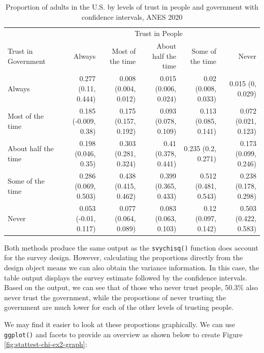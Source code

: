\documentclass[
]{krantz}
\begin{document}
\begin{longtable}{l|rrrrr}
\caption{\label{tab:stattest-chi-ex2-prop2-tab}Proportion of adults in the U.S. by levels of trust in people and government with confidence intervals, ANES 2020}\\
\toprule
\multicolumn{1}{l}{} & \multicolumn{5}{c}{Trust in People} \\ 
\cmidrule(lr){2-6}
\multicolumn{1}{l}{Trust in Government} & Always & Most of the time & About half the time & Some of the time & Never \\ 
\midrule
Always & 0.277 (0.11, 0.444) & 0.008 (0.004, 0.012) & 0.015 (0.006, 0.024) & 0.02 (0.008, 0.033) & 0.015 (0, 0.029) \\ 
Most of the time & 0.185 (-0.009, 0.38) & 0.175 (0.157, 0.192) & 0.093 (0.078, 0.109) & 0.113 (0.085, 0.141) & 0.072 (0.021, 0.123) \\ 
About half the time & 0.198 (0.046, 0.35) & 0.303 (0.281, 0.324) & 0.41 (0.378, 0.441) & 0.235 (0.2, 0.271) & 0.173 (0.099, 0.246) \\ 
Some of the time & 0.286 (0.069, 0.503) & 0.438 (0.415, 0.462) & 0.399 (0.365, 0.433) & 0.512 (0.481, 0.543) & 0.238 (0.178, 0.298) \\ 
Never & 0.053 (-0.01, 0.117) & 0.077 (0.064, 0.089) & 0.083 (0.063, 0.103) & 0.12 (0.097, 0.142) & 0.503 (0.422, 0.583) \\ 
\bottomrule
\end{longtable}

Both methods produce the same output as the \texttt{svychisq()} function does account for the survey design. However, calculating the proportions directly from the design object means we can also obtain the variance information. In this case, the table output displays the survey estimate followed by the confidence intervals. Based on the output, we can see that of those who never trust people, 50.3\% also never trust the government, while the proportions of never trusting the government are much lower for each of the other levels of trusting people.

We may find it easier to look at these proportions graphically. We can use \texttt{ggplot()} and facets to provide an overview as shown below to create Figure \ref{fig:stattest-chi-ex2-graph}:
\end{document}
